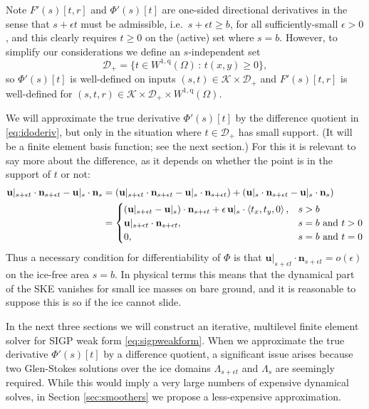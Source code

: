 \documentclass[letterpaper,final,12pt,reqno]{amsart}
\theoremstyle{claim}
\newcommand{\eps}{\epsilon}
\newcommand{\bn}{\mathbf{n}}
\newcommand{\bu}{\mathbf{u}}
\newcommand{\qq}{{\text{q}}}
\newcommand{\bus}{\bu|_s}
\numberwithin{equation}{section}
\numberwithin{figure}{section}
\numberwithin{table}{section}
\numberwithin{theorem}{section}
\begin{document}
Note $F'(s)[t,r]$ and $\Phi'(s)[t]$ are one-sided directional derivatives in the sense that $s+\eps t$ must be admissible, i.e.~$s+\eps t\ge b$, for all sufficiently-small $\eps>0$, and this clearly requires $t\ge 0$ on the (active) set where $s=b$.  However, to simplify our considerations we define an $s$-independent set
\begin{equation}
\mathcal{D}_+ = \{t \in W^{1,\qq}(\Omega) \,:\, t(x,y) \ge 0\}, \label{eq:infdefectset}
\end{equation}
so $\Phi'(s)[t]$ is well-defined on inputs $(s,t) \in \mathcal{K} \times \mathcal{D}_+$ and $F'(s)[t,r]$ is well-defined for $(s,t,r) \in \mathcal{K} \times \mathcal{D}_+ \times W^{1,\qq}(\Omega)$.

We will approximate the true derivative $\Phi'(s)[t]$ by the difference quotient in \eqref{eq:idoderiv}, but only in the situation where $t \in \mathcal{D}_+$ has small support.  (It will be a finite element basis function; see the next section.)  For this it is relevant to say more about the difference, as it depends on whether the point is in the support of $t$ or not:
\begin{align}
\bu|_{s+\eps t} \cdot \bn_{s+\eps t} - \bus \cdot \bn_s &= \left(\bu|_{s+\eps t} \cdot \bn_{s+\eps t} - \bus \cdot \bn_{s+\eps t}\right) + \left(\bus \cdot \bn_{s+\eps t} - \bus \cdot \bn_s\right) \label{eq:differencecases} \\
    &= \begin{cases}
           (\bu|_{s+\eps t} - \bus) \cdot \bn_{s+\eps t} + \eps\, \bus \cdot \left<t_x,t_y,0\right>, & s > b \\
           \bu|_{s+\eps t} \cdot \bn_{s+\eps t}, & s=b \text{ and } t > 0 \\
           0, & s=b \text{ and } t = 0
                 \end{cases} \notag
\end{align}
Thus a necessary condition for differentiability of $\Phi$ is that $\bu|_{s+\eps t} \cdot \bn_{s+\eps t} = o(\eps)$ on the ice-free area $s=b$.  In physical terms this means that the dynamical part of the SKE vanishes for small ice masses on bare ground, and it is reasonable to suppose this is so if the ice cannot slide.

In the next three sections we will construct an iterative, multilevel finite element solver for SIGP weak form \eqref{eq:sigpweakform}.  When we approximate the true derivative $\Phi'(s)[t]$ by a difference quotient, a significant issue arises because two Glen-Stokes solutions over the ice domains $\Lambda_{s+\eps t}$ and $\Lambda_s$ are seemingly required.  While this would imply a very large numbers of expensive dynamical solves, in Section \ref{sec:smoothers} we propose a less-expensive approximation.
\end{document}
